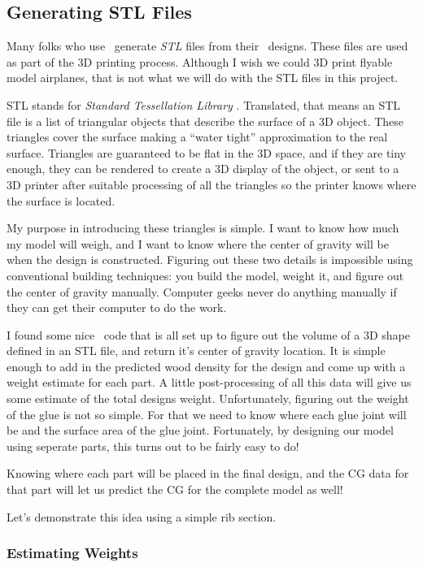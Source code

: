 \subsection{Generating STL Files}

Many folks who use \osc\ generate {\it STL} files from their \osc\ designs. These
files are used as part of the 3D printing process. Although I wish we could 3D
print flyable model airplanes, that is not what we will do with the STL files
in this project.

STL stands for {\it Standard Tessellation Library} \citep{stlwiki}. Translated,
that means an STL file is a list of triangular objects that describe the
surface of a 3D object. These triangles cover the surface making a ``water
tight'' approximation to the real surface. Triangles are guaranteed to be flat
in the 3D space, and if they are tiny enough, they can be rendered to create a
3D display of the object, or sent to a 3D printer after suitable processing of all
the triangles so the printer knows where the surface is located.

My purpose in introducing these triangles is simple. I want to know how much my
model will weigh, and I want to know where the center of gravity will be when
the design is constructed. Figuring out these two details is impossible using
conventional building techniques: you build the model, weight it, and figure
out the center of gravity manually. Computer geeks never do anything manually
if they can get their computer to do the work.

I found some nice \PY\ code that is all set up to figure out the volume of a 3D
shape defined in an STL file, and return it's center of gravity location. It is
simple enough to add in the predicted wood density for the design and come up
with a weight estimate for each part. A little post-processing of all this data
will give us some estimate of the total designs weight. Unfortunately, figuring
out the weight of the glue is not so simple. For that we need to know where
each glue joint will be and the surface area of the glue joint. Fortunately, by
designing our model using seperate parts, this turns out to be fairly easy to
do!

Knowing where each part will be placed in the final design, and the CG data for
that part will let us predict the CG for the complete model as well!

Let's demonstrate this idea using a simple rib section.

\subsubsection{Estimating Weights}

